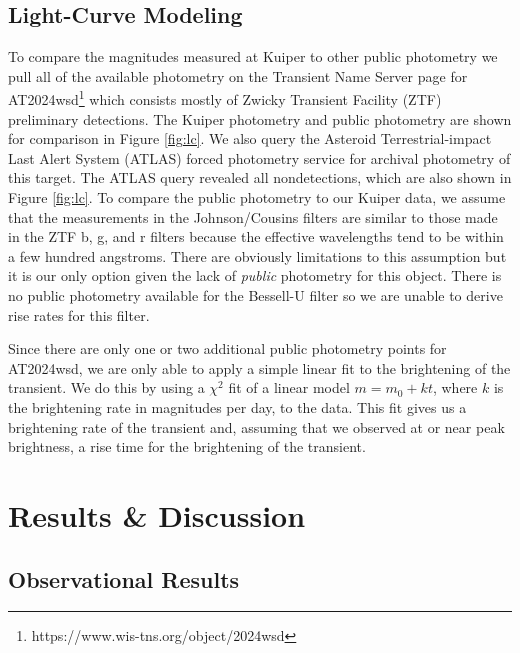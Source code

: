 \documentclass{aastex631}
\begin{document}
\subsection{Light-Curve Modeling}
To compare the magnitudes measured at Kuiper to other public photometry we pull all of the available photometry on the Transient Name Server page for AT2024wsd\footnote{https://www.wis-tns.org/object/2024wsd} which consists mostly of Zwicky Transient Facility (ZTF) preliminary detections. The Kuiper photometry and public photometry are shown for comparison in Figure \ref{fig:lc}. We also query the Asteroid Terrestrial-impact Last Alert System (ATLAS) forced photometry service for archival photometry of this target. The ATLAS query revealed all nondetections, which are also shown in Figure \ref{fig:lc}. To compare the public photometry to our Kuiper data, we assume that the measurements in the Johnson/Cousins filters are similar to those made in the ZTF b, g, and r filters because the effective wavelengths tend to be within a few hundred angstroms. There are obviously limitations to this assumption but it is our only option given the lack of {\it public} photometry for this object. There is no public photometry available for the Bessell-U filter so we are unable to derive rise rates for this filter.

Since there are only one or two additional public photometry points for AT2024wsd, we are only able to apply a simple linear fit to the brightening of the transient. We do this by using a $\chi^2$ fit of a linear model $m = m_0 + kt$, where $k$ is the brightening rate in magnitudes per day, to the data. This fit gives us a brightening rate of the transient and, assuming that we observed at or near peak brightness, a rise time for the brightening of the transient. 

\section{Results \& Discussion}\label{sec:res}
\subsection{Observational Results}
\end{document}
